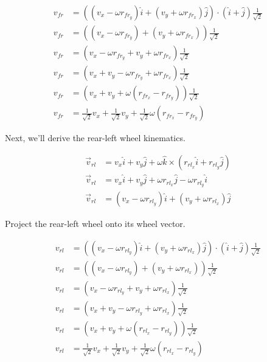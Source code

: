 \begin{align}
  v_{fr} &= ((v_x - \omega r_{fr_y}) \hat{i} + (v_y + \omega r_{fr_x}) \hat{j})
    \cdot (\hat{i} + \hat{j}) \frac{1}{\sqrt{2}} \nonumber \\
  v_{fr} &= ((v_x - \omega r_{fr_y}) + (v_y + \omega r_{fr_x}))
    \frac{1}{\sqrt{2}} \nonumber \\
  v_{fr} &= (v_x - \omega r_{fr_y} + v_y + \omega r_{fr_x})
    \frac{1}{\sqrt{2}} \nonumber \\
  v_{fr} &= (v_x + v_y - \omega r_{fr_y} + \omega r_{fr_x})
    \frac{1}{\sqrt{2}} \nonumber \\
  v_{fr} &= (v_x + v_y + \omega (r_{fr_x} - r_{fr_y}))
    \frac{1}{\sqrt{2}} \nonumber \\
  v_{fr} &= \frac{1}{\sqrt{2}} v_x + \frac{1}{\sqrt{2}} v_y +
    \frac{1}{\sqrt{2}} \omega (r_{fr_x} - r_{fr_y})
\end{align}

Next, we'll derive the rear-left wheel kinematics.

\begin{align*}
  \vec{v}_{rl} &= v_x \hat{i} + v_y \hat{j} +
    \omega \hat{k} \times (r_{rl_x} \hat{i} + r_{rl_y} \hat{j}) \\
  \vec{v}_{rl} &= v_x \hat{i} + v_y \hat{j} +
    \omega r_{rl_x} \hat{j} - \omega r_{rl_y} \hat{i} \\
  \vec{v}_{rl} &= (v_x - \omega r_{rl_y}) \hat{i} +
    (v_y + \omega r_{rl_x}) \hat{j}
\end{align*}

Project the rear-left wheel onto its wheel vector.

\begin{align}
  v_{rl} &= ((v_x - \omega r_{rl_y}) \hat{i} + (v_y + \omega r_{rl_x}) \hat{j})
    \cdot (\hat{i} + \hat{j}) \frac{1}{\sqrt{2}} \nonumber \\
  v_{rl} &= ((v_x - \omega r_{rl_y}) + (v_y + \omega r_{rl_x}))
    \frac{1}{\sqrt{2}} \nonumber \\
  v_{rl} &= (v_x - \omega r_{rl_y} + v_y + \omega r_{rl_x})
    \frac{1}{\sqrt{2}} \nonumber \\
  v_{rl} &= (v_x + v_y - \omega r_{rl_y} + \omega r_{rl_x})
    \frac{1}{\sqrt{2}} \nonumber \\
  v_{rl} &= (v_x + v_y + \omega (r_{rl_x} - r_{rl_y}))
    \frac{1}{\sqrt{2}} \nonumber \\
  v_{rl} &= \frac{1}{\sqrt{2}} v_x + \frac{1}{\sqrt{2}} v_y +
    \frac{1}{\sqrt{2}} \omega (r_{rl_x} - r_{rl_y})
\end{align}

